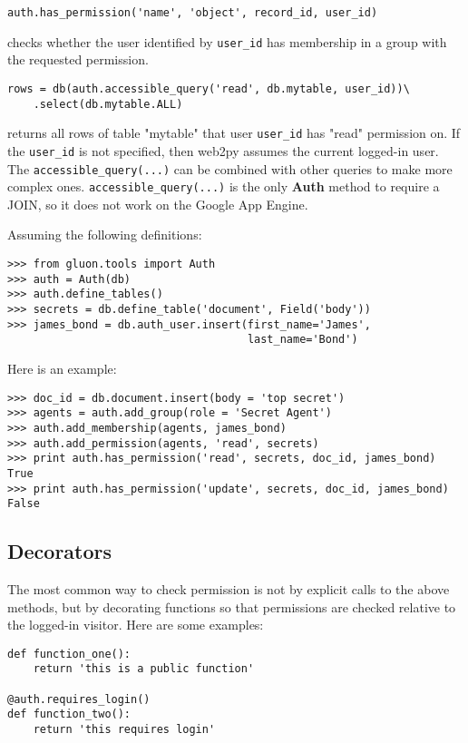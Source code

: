 \documentclass[justified,sixbynine,notoc]{tufte-book}
\def\ft{\small\tt}
\begin{document}
\begin{fullwidth}
\begin{lstlisting}
auth.has_permission('name', 'object', record_id, user_id)
\end{lstlisting}
\noindent checks whether the user identified by {\ft user\_id} has membership in a group with the requested permission.

\begin{lstlisting}
rows = db(auth.accessible_query('read', db.mytable, user_id))\
    .select(db.mytable.ALL)
\end{lstlisting}
\noindent returns all rows of table "mytable" that user {\ft user\_id} has "read" permission on.
If the {\ft user\_id} is not specified, then web2py assumes the current logged-in user.
The {\ft accessible\_query(...)} can be combined with other queries to make more complex ones.
{\ft accessible\_query(...)} is the only {\bf Auth} method to require a JOIN, so it does not work on the Google App Engine.

Assuming the following definitions:
\begin{lstlisting}
>>> from gluon.tools import Auth
>>> auth = Auth(db)
>>> auth.define_tables()
>>> secrets = db.define_table('document', Field('body'))
>>> james_bond = db.auth_user.insert(first_name='James',
                                     last_name='Bond')
\end{lstlisting}

Here is an example:
\begin{lstlisting}
>>> doc_id = db.document.insert(body = 'top secret')
>>> agents = auth.add_group(role = 'Secret Agent')
>>> auth.add_membership(agents, james_bond)
>>> auth.add_permission(agents, 'read', secrets)
>>> print auth.has_permission('read', secrets, doc_id, james_bond)
True
>>> print auth.has_permission('update', secrets, doc_id, james_bond)
False
\end{lstlisting}

\goodbreak\subsection{Decorators}

The most common way to check permission is not by explicit calls to the above methods, but by decorating functions so that permissions are checked relative to the logged-in visitor. Here are some examples:
\begin{lstlisting}
def function_one():
    return 'this is a public function'

@auth.requires_login()
def function_two():
    return 'this requires login'


\end{lstlisting}
\end{fullwidth}
\end{document}
